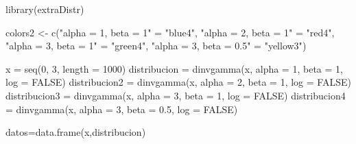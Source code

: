 \documentclass[
]{article}
\newenvironment{Shaded}{\begin{snugshade}}{\end{snugshade}}
\newcommand{\AttributeTok}[1]{\textcolor[rgb]{0.77,0.63,0.00}{#1}}
\newcommand{\ConstantTok}[1]{\textcolor[rgb]{0.00,0.00,0.00}{#1}}
\newcommand{\DecValTok}[1]{\textcolor[rgb]{0.00,0.00,0.81}{#1}}
\newcommand{\FloatTok}[1]{\textcolor[rgb]{0.00,0.00,0.81}{#1}}
\newcommand{\FunctionTok}[1]{\textcolor[rgb]{0.00,0.00,0.00}{#1}}
\newcommand{\NormalTok}[1]{#1}
\newcommand{\OtherTok}[1]{\textcolor[rgb]{0.56,0.35,0.01}{#1}}
\newcommand{\StringTok}[1]{\textcolor[rgb]{0.31,0.60,0.02}{#1}}
\begin{document}
\begin{Shaded}
\begin{Highlighting}[]
\FunctionTok{library}\NormalTok{(extraDistr)}

\NormalTok{colors2 }\OtherTok{\textless{}{-}} \FunctionTok{c}\NormalTok{(}\StringTok{"alpha = 1, beta = 1"} \OtherTok{=} \StringTok{"blue4"}\NormalTok{, }\StringTok{"alpha = 2, beta = 1"} \OtherTok{=} \StringTok{"red4"}\NormalTok{, }\StringTok{"alpha = 3, beta = 1"} \OtherTok{=} \StringTok{"green4"}\NormalTok{, }\StringTok{"alpha = 3, beta = 0.5"} \OtherTok{=} \StringTok{"yellow3"}\NormalTok{)}

\NormalTok{x }\OtherTok{=} \FunctionTok{seq}\NormalTok{(}\DecValTok{0}\NormalTok{, }\DecValTok{3}\NormalTok{, }\AttributeTok{length =} \DecValTok{1000}\NormalTok{)}
\NormalTok{distribucion }\OtherTok{=} \FunctionTok{dinvgamma}\NormalTok{(x, }\AttributeTok{alpha =} \DecValTok{1}\NormalTok{, }\AttributeTok{beta =} \DecValTok{1}\NormalTok{, }\AttributeTok{log =} \ConstantTok{FALSE}\NormalTok{)}
\NormalTok{distribucion2 }\OtherTok{=} \FunctionTok{dinvgamma}\NormalTok{(x, }\AttributeTok{alpha =} \DecValTok{2}\NormalTok{, }\AttributeTok{beta =} \DecValTok{1}\NormalTok{, }\AttributeTok{log =} \ConstantTok{FALSE}\NormalTok{)}
\NormalTok{distribucion3 }\OtherTok{=} \FunctionTok{dinvgamma}\NormalTok{(x, }\AttributeTok{alpha =} \DecValTok{3}\NormalTok{, }\AttributeTok{beta =} \DecValTok{1}\NormalTok{, }\AttributeTok{log =} \ConstantTok{FALSE}\NormalTok{)}
\NormalTok{distribucion4 }\OtherTok{=} \FunctionTok{dinvgamma}\NormalTok{(x, }\AttributeTok{alpha =} \DecValTok{3}\NormalTok{, }\AttributeTok{beta =} \FloatTok{0.5}\NormalTok{, }\AttributeTok{log =} \ConstantTok{FALSE}\NormalTok{)}

\NormalTok{datos}\OtherTok{=}\FunctionTok{data.frame}\NormalTok{(x,distribucion)}


\end{Highlighting}
\end{Shaded}
\end{document}
